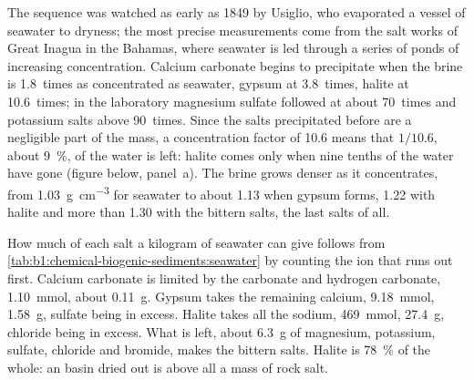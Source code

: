 The sequence was watched as early as 1849 by Usiglio, who evaporated a vessel
of seawater to dryness; the most precise measurements come from the salt
works of Great Inagua in the Bahamas, where seawater is led through a series of
ponds of increasing concentration. Calcium carbonate begins to precipitate when
the brine is 1.8~times as concentrated as seawater, gypsum at 3.8~times, halite
at 10.6~times; in the laboratory magnesium sulfate followed at about 70~times
and potassium salts above 90~times. Since the salts precipitated before are a
negligible part of the mass, a concentration factor of 10.6 means that
$1/10.6$, about \qty{9}{\%}, of the water is left: halite comes only when nine
tenths of the water have gone (figure below, panel~a).
The brine grows denser as it concentrates, from \qty{1.03}{g.cm^{-3}} for
seawater to about \num{1.13} when gypsum forms, \num{1.22} with halite and more
than \num{1.30} with the bittern salts, the last salts of all.

How much of each salt a kilogram of seawater can give follows from
\cref{tab:b1:chemical-biogenic-sediments:seawater} by counting the ion that runs
out first. Calcium carbonate is limited by the carbonate and hydrogen carbonate,
\qty{1.10}{mmol}, about \qty{0.11}{g}. Gypsum takes the remaining calcium,
\qty{9.18}{mmol}, \qty{1.58}{g}, sulfate being in excess. Halite takes all the
sodium, \qty{469}{mmol}, \qty{27.4}{g}, chloride being in excess. What is left,
about \qty{6.3}{g} of magnesium, potassium, sulfate, chloride and bromide, makes
the bittern salts. Halite is \qty{78}{\%} of the whole: an  basin
dried out is above all a mass of rock salt.

